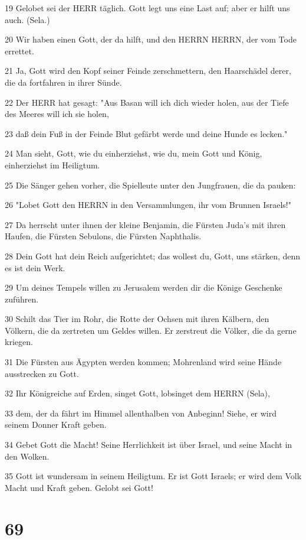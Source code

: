 \par 19 Gelobet sei der HERR täglich. Gott legt uns eine Last auf; aber er hilft uns auch. (Sela.)
\par 20 Wir haben einen Gott, der da hilft, und den HERRN HERRN, der vom Tode errettet.
\par 21 Ja, Gott wird den Kopf seiner Feinde zerschmettern, den Haarschädel derer, die da fortfahren in ihrer Sünde.
\par 22 Der HERR hat gesagt: "Aus Basan will ich dich wieder holen, aus der Tiefe des Meeres will ich sie holen,
\par 23 daß dein Fuß in der Feinde Blut gefärbt werde und deine Hunde es lecken."
\par 24 Man sieht, Gott, wie du einherziehst, wie du, mein Gott und König, einherziehst im Heiligtum.
\par 25 Die Sänger gehen vorher, die Spielleute unter den Jungfrauen, die da pauken:
\par 26 "Lobet Gott den HERRN in den Versammlungen, ihr vom Brunnen Israels!"
\par 27 Da herrscht unter ihnen der kleine Benjamin, die Fürsten Juda's mit ihren Haufen, die Fürsten Sebulons, die Fürsten Naphthalis.
\par 28 Dein Gott hat dein Reich aufgerichtet; das wollest du, Gott, uns stärken, denn es ist dein Werk.
\par 29 Um deines Tempels willen zu Jerusalem werden dir die Könige Geschenke zuführen.
\par 30 Schilt das Tier im Rohr, die Rotte der Ochsen mit ihren Kälbern, den Völkern, die da zertreten um Geldes willen. Er zerstreut die Völker, die da gerne kriegen.
\par 31 Die Fürsten aus Ägypten werden kommen; Mohrenland wird seine Hände ausstrecken zu Gott.
\par 32 Ihr Königreiche auf Erden, singet Gott, lobsinget dem HERRN (Sela),
\par 33 dem, der da fährt im Himmel allenthalben von Anbeginn! Siehe, er wird seinem Donner Kraft geben.
\par 34 Gebet Gott die Macht! Seine Herrlichkeit ist über Israel, und seine Macht in den Wolken.
\par 35 Gott ist wundersam in seinem Heiligtum. Er ist Gott Israels; er wird dem Volk Macht und Kraft geben. Gelobt sei Gott!

\chapter{69}


